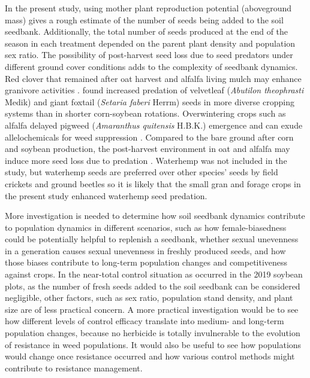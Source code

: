 \documentclass[
]{article}
\begin{document}
In the present study, using mother plant reproduction potential (aboveground mass) gives a rough estimate of the number of seeds being added to the soil seedbank. Additionally, the total number of seeds produced at the end of the season in each treatment depended on the parent plant density and population sex ratio. The possibility of post-harvest seed loss due to seed predators under different ground cover conditions adds to the complexity of seedbank dynamics. Red clover that remained after oat harvest and alfalfa living mulch may enhance granivore activities \citep{davisCroppingSystemEffects2003, gallandtEffectCovercroppingSystems2005}. \citet{heggenstallerSeasonalPatternsPostdispersal2006} found increased predation of velvetleaf (\emph{Abutilon theophrasti} Medik) and giant foxtail (\emph{Setaria faberi} Herrm) seeds in more diverse cropping systems than in shorter corn-soybean rotations. Overwintering crops such as alfalfa delayed pigweed (\emph{Amaranthus quitensis} H.B.K.) emergence \citep{huarteUnderstandingMechanismsReduced2003} and can exude allelochemicals for weed suppression \citep{millerAllelopathyForageCrop1996}. Compared to the bare ground after corn and soybean production, the post-harvest environment in oat and alfalfa may induce more seed loss due to predation \citep{gallandtEffectCovercroppingSystems2005}. Waterhemp was not included in the \citet{heggenstallerSeasonalPatternsPostdispersal2006} study, but waterhemp seeds are preferred over other species' seeds by field crickets and ground beetles \citep{vanderlaatPostdispersalWeedSeed2015} so it is likely that the small gran and forage crops in the present study enhanced waterhemp seed predation.

More investigation is needed to determine how soil seedbank dynamics contribute to population dynamics in different scenarios, such as how female-biasedness could be potentially helpful to replenish a seedbank, whether sexual unevenness in a generation causes sexual unevenness in freshly produced seeds, and how those biases contribute to long-term population changes and competitiveness against crops. In the near-total control situation as occurred in the 2019 soybean plots, as the number of fresh seeds added to the soil seedbank can be considered negligible, other factors, such as sex ratio, population stand density, and plant size are of less practical concern. A more practical investigation would be to see how different levels of control efficacy translate into medium- and long-term population changes, because no herbicide is totally invulnerable to the evolution of resistance in weed populations. It would also be useful to see how populations would change once resistance occurred and how various control methods might contribute to resistance management.
\end{document}
